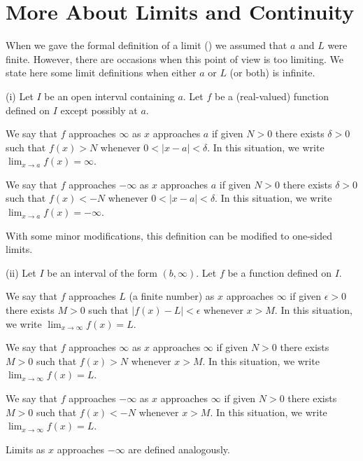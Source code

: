 \section{More About Limits and Continuity}{}{}

When we gave the formal definition of a limit () we
assumed that $a$ and $L$ were finite. However, there are occasions
when this point of view is too limiting. We state here some limit
definitions when either $a$ or $L$ (or both) is infinite.

 \relax (i) Let $I$ be an open interval containing $a$. Let $f$ be a
(real-valued) function defined on $I$ except possibly at $a$.

We say that $f$ approaches $\infty $ as $x$ approaches $a$ if given
$N>0 $ there exists $\delta >0 $ such that $f(x) >N$ whenever $0<
|x-a| < \delta $.  In this situation, we write $\displaystyle{\lim
_{x\rightarrow a} f(x) }=\infty $.

We say that $f$ approaches $-\infty $ as $x$ approaches $a$ if given
 $N>0 $ there exists $\delta >0 $ such that $f(x) <-N $ whenever
 $0<|x-a| < \delta $. In this situation, we write $\displaystyle{\lim
 _{x\rightarrow a} f(x) }=-\infty $.


With some minor modifications, this definition can be modified to
one-sided limits.

 (ii) Let $I$ be an interval of the form $(b,\infty ) $. Let $f$ be a
 function defined on $I$.

 We say that $f$ approaches $L$ (a finite number) as $x$ approaches
  $\infty $ if given $\epsilon >0 $ there exists $M>0 $ such that
  $|f(x) -L |< \epsilon $ whenever $x>M $.  In this situation, we
  write $\displaystyle{\lim _{x\rightarrow \infty } f(x) }=L $.

We say that $f$ approaches $\infty $ as $x$ approaches $\infty $ if
  given $N >0 $ there exists $M>0 $ such that $f(x) > N $ whenever
  $x>M $.  In this situation, we write $\displaystyle{\lim
  _{x\rightarrow \infty } f(x) }=L $.

 We say that $f$ approaches $-\infty $ as $x$ approaches $\infty $ if
  given $N >0 $ there exists $M>0 $ such that $ f(x) < -N$ whenever
  $x>M $.  In this situation, we write $\displaystyle{\lim
  _{x\rightarrow \infty } f(x) }=L $.

 Limits as $x$ approaches $-\infty $ are defined analogously.

\enddef
{}

